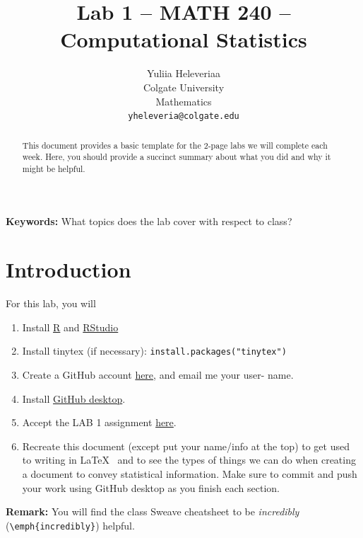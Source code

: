 \documentclass{article}\usepackage[]{graphicx}\usepackage[]{xcolor}
\begin{document}
\vspace{-1in}
\title{Lab 1 -- MATH 240 -- Computational Statistics}

\author{
  Yuliia Heleveriaa \\
  Colgate University  \\
  Mathematics  \\
  {\tt yheleveria@colgate.edu}
}

\date{}

\maketitle

\begin{multicols}{2}
\begin{abstract}
This document provides a basic template for the 2-page labs we will complete each week. Here, you should provide a succinct summary about what you did and why it might be helpful.
\end{abstract}

\textbf{Keywords:} What topics does the lab cover with respect to class?


\section{Introduction}
For this lab, you will
\begin{enumerate}
  \item Install \href{https://cran.rstudio.com/}{R} and \href{https://posit.co/download/rstudio-desktop/}{RStudio}
  \item Install tinytex (if necessary):
  \newline
     \texttt{install.packages("tinytex")}
  \item Create a GitHub account \href{https://github.com/}{here}, and email me your user- name.
  \item Install \href{https://desktop.github.com/}{GitHub desktop}.
  \item Accept the LAB 1 assignment \href{https://classroom.github.com/a/gfC_xMMl}{here}. 
  \item Recreate this document (except put your name/info at the top) to get used to writing in \LaTeX~ and to see the types of things we can do when creating a document to convey statistical information. Make sure to commit and push your work using GitHub desktop as you finish each section.
\end{enumerate}
\textbf{Remark:} You will find the class Sweave cheatsheet to be \emph{incredibly} (\verb|\emph{incredibly}|) helpful.



\end{multicols}
\end{document}
